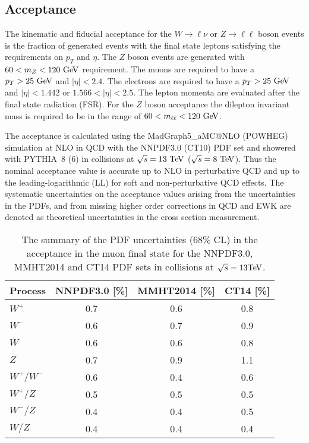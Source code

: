 \subsection{Acceptance}

The kinematic and fiducial acceptance for the $W \rightarrow{\ell\nu}$ or $Z\rightarrow\ell\ell$ boson events is the fraction of generated events with the final state leptons satisfying the requirements on $p_{T}$ and $\eta$. The $Z$ boson events are generated with $60<m_{Z}<120~\mathrm{Ge\kern -0.1em V}$ requirement. The muons are required to have a $p_{T}>25~\mathrm{Ge\kern -0.1em V}$ and $|\eta|<2.4$. The electrons are required to have a $p_{T}>25~\mathrm{Ge\kern -0.1em V}$ and $|\eta|<1.442$ or $1.566<|\eta|<2.5$. The lepton momenta are evaluated after the final state radiation (FSR). For the $Z$ boson acceptance the dilepton invariant mass is required to be in the range of $60<m_{\ell\ell}<120~\mathrm{Ge\kern -0.1em V}$.

The acceptance is calculated using the MadGraph5\_aMC@NLO (POWHEG) simulation at NLO in QCD with the NNPDF3.0 (CT10) PDF set and showered with PYTHIA~8 (6) in collisions at $\sqrt{s}=13~\mathrm{Te\kern -0.1em V}$ ($\sqrt{s}=8~\mathrm{Te\kern -0.1em V}$). Thus the nominal acceptance value is accurate up to NLO in perturbative QCD and up to the leading-logarithmic (LL) for soft and non-perturbative QCD effects. The systematic uncertainties on the acceptance values arising from the uncertainties in the PDFs, and from missing higher order corrections in QCD and EWK are denoted as theoretical uncertainties in the cross section measurement. 
\begin{table}
\begin{center}
\begin{tabular}{|l|c|c|c|}
\hline
Process  &  NNPDF3.0 [\%]  &  MMHT2014 [\%]  &  CT14 [\%] \\
\hline
\hline
$W^+$        & 0.7          &  0.6           &  0.8 \\
$W^-$  & 0.6          &  0.7           &  0.9 \\
$W$            & 0.6          &  0.6           &  0.8 \\
$Z$            & 0.7          &  0.9           &  1.1 \\
$W^+/W^-$                        & 0.6          &  0.4           &  0.6 \\
$W^+/Z$                           & 0.5          &  0.5           &  0.5 \\
$W^-/Z$                           & 0.4          &  0.4           &  0.5 \\
$W/Z$                            & 0.4          &  0.4           &  0.4 \\
\hline
\hline
\end{tabular}
\caption{The summary of the PDF uncertainties ($68\%$ CL) in the acceptance in the muon final state for the NNPDF3.0, MMHT2014 and CT14 PDF sets in collisions at $\sqrt{s}=13\mathrm{Te\kern -0.1em V}$.}
\label{tab:pdf_mu}
\end{center}
\end{table}

